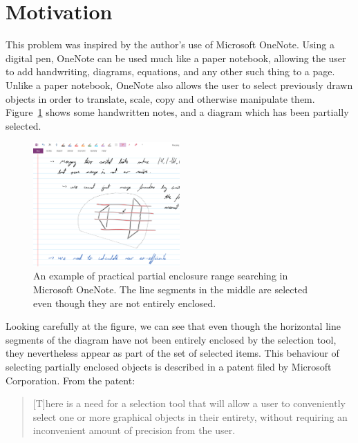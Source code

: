 \section{Motivation}
\label{:intro:motivation}

This problem was inspired by the author's use of Microsoft OneNote. 
Using a digital pen, OneNote can be used much like a paper notebook, allowing the user to add handwriting, diagrams, equations, and any other such thing to a page.
Unlike a paper notebook, OneNote also allows the user to select previously drawn objects in order to translate, scale, copy and otherwise manipulate them.
Figure~\ref{fig:intro:onenote} shows some handwritten notes, and a diagram which has been partially selected.

\begin{figure}
\begin{center}
  \includegraphics[width=0.50\textwidth]{figures/fig_onenote}
  \caption[An example of practical partial enclosure range searching]{An example of practical partial enclosure range searching in Microsoft OneNote. The line segments in the middle are selected even though they are not entirely enclosed.}
  \label{fig:intro:onenote}
\end{center}
\end{figure}

Looking carefully at the figure, we can see that even though the horizontal line segments of the diagram have not been entirely enclosed by the selection tool, they nevertheless appear as part of the set of selected items.
This behaviour of selecting partially enclosed objects is described in a patent filed by Microsoft Corporation\cite{lassoselect}. 
From the patent:

\begin{quote}
[T]here is a need for a selection tool that will allow a user to conveniently select one or more graphical objects in their entirety, without requiring an inconvenient amount of precision from the user.
\end{quote}

